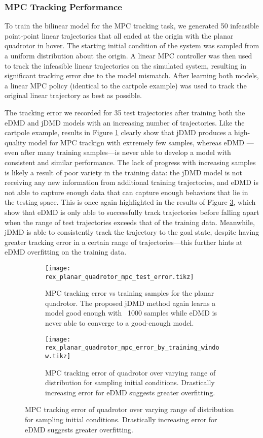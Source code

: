 \documentclass{article}
\begin{document}
\subsubsection{MPC Tracking Performance}

To train the bilinear model for the MPC tracking task, we generated 50 infeasible point-point
linear trajectories that all ended at the origin with the planar quadrotor in hover. The starting
initial condition of the system was sampled from a uniform distribution about the origin.
A linear MPC controller was then used to track the infeasible linear trajectories on the
simulated system, resulting in significant tracking error due to the model mismatch. 
After learning both models, a linear MPC policy (identical to the cartpole example) was
used to track the original linear trajectory as best as possible.

The tracking error we recorded for 35 test trajectories after training both the eDMD 
and jDMD models with an increasing number of trajectories. Like the cartpole example,
results in Figure \ref{fig:rex_planar_quadrotor_mpc_test_error} clearly show that jDMD
produces a high-quality model for MPC trackign with extremely few samples, whereas eDMD
---even after many training samples---is never able to develop a model with consistent
and similar performance. The lack of progress with increasing samples is likely a result
of poor variety in the training data: the jDMD model is not receiving any new information
from additional training trajectories, and eDMD is not able to capture enough data that
can capture enough behaviors that lie in the testing space. This is once again highlighted
in the results of Figure \ref{fig:rex_planar_quadrotor_mpc_error_by_training_window}, which
show that eDMD is only able to successfully track trajectories before falling apart when the
range of test trajectories exceeds that of the training data. Meanwhile, jDMD is able to consistently
track the trajectory to the goal state, despite having greater tracking error in a certain range
of trajectories---this further hints at eDMD overfitting on the training data.

\begin{figure}[t]
	\centering
	\begin{subfigure}[t]{0.48\textwidth}
		\raggedleft
		\texttt{[image: rex\_planar\_quadrotor\_mpc\_test\_error.tikz]}
		\caption{MPC tracking error vs training samples for the planar quadrotor. The proposed jDMD method again learns a model good enough with ~1000 samples while eDMD is never able to converge to a good-enough model.}
		\label{fig:rex_planar_quadrotor_mpc_test_error}
	\end{subfigure}
	\hfill
	\begin{subfigure}[t]{0.48\textwidth}
		\raggedright
		\texttt{[image: rex\_planar\_quadrotor\_mpc\_error\_by\_training\_window.tikz]}
		\caption{MPC tracking error of quadrotor over varying range of distribution for sampling initial conditions. Drastically increasing error for eDMD suggests greater overfitting.}
		\label{fig:rex_planar_quadrotor_mpc_error_by_training_window}
	\end{subfigure}
\end{figure}
\end{document}

